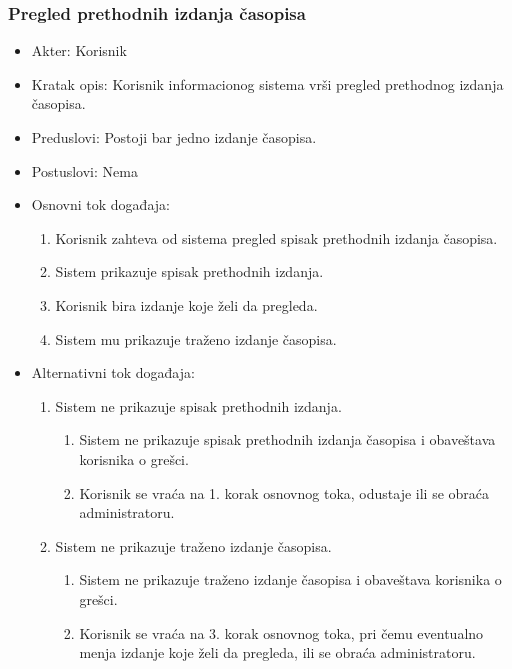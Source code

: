 \documentclass[a4paper]{article}
\begin{document}
\subsubsection{Pregled prethodnih izdanja časopisa}
\begin{itemize}
    \item Akter: Korisnik
    \item Kratak opis: Korisnik informacionog sistema vrši pregled prethodnog izdanja časopisa.
    \item Preduslovi: Postoji bar jedno izdanje časopisa.
    \item Postuslovi: Nema
    \item Osnovni tok događaja:
        \begin{enumerate}
            \item Korisnik zahteva od sistema pregled spisak prethodnih izdanja časopisa.
            \item Sistem prikazuje spisak prethodnih izdanja.
            \item Korisnik bira izdanje koje želi da pregleda.
            \item Sistem mu prikazuje traženo izdanje časopisa.
        \end{enumerate}
    \item Alternativni tok događaja:
        \begin{enumerate}
            \item Sistem ne prikazuje spisak prethodnih izdanja.
            \begin{enumerate}
                \item Sistem ne prikazuje spisak prethodnih izdanja časopisa i obaveštava korisnika o grešci.
                \item Korisnik se vraća na 1. korak osnovnog toka, odustaje ili se obraća administratoru.
            \end{enumerate}
            \item Sistem ne prikazuje traženo izdanje časopisa.
            \begin{enumerate}
                \item Sistem ne prikazuje traženo izdanje časopisa i obaveštava korisnika o grešci.
                \item Korisnik se vraća na 3. korak osnovnog toka, pri čemu eventualno menja izdanje koje želi da pregleda, ili se obraća administratoru.
            \end{enumerate}
        \end{enumerate}
\end{itemize}
\end{document}
